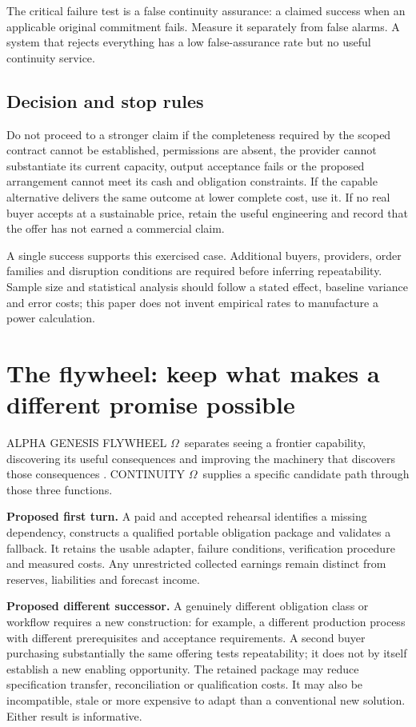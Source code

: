 \documentclass[11pt,a4paper]{article}
\newcommand{\om}{CONTINUITY $\Omega$}
\newcommand{\genesis}{ALPHA GENESIS FLYWHEEL $\Omega$}
\newcommand{\chapterpage}{\clearpage}
\begin{document}
The critical failure test is a false continuity assurance: a claimed success when an applicable original commitment fails. Measure it separately from false alarms. A system that rejects everything has a low false-assurance rate but no useful continuity service.

\subsection{Decision and stop rules}
Do not proceed to a stronger claim if the completeness required by the scoped contract cannot be established, permissions are absent, the provider cannot substantiate its current capacity, output acceptance fails or the proposed arrangement cannot meet its cash and obligation constraints. If the capable alternative delivers the same outcome at lower complete cost, use it. If no real buyer accepts at a sustainable price, retain the useful engineering and record that the offer has not earned a commercial claim.

A single success supports this exercised case. Additional buyers, providers, order families and disruption conditions are required before inferring repeatability. Sample size and statistical analysis should follow a stated effect, baseline variance and error costs; this paper does not invent empirical rates to manufacture a power calculation.

\chapterpage
\section{The flywheel: keep what makes a different promise possible}\label{sec:flywheel}
\genesis\ separates seeing a frontier capability, discovering its useful consequences and improving the machinery that discovers those consequences \cite{boucherGenesis}. \om\ supplies a specific candidate path through those three functions.

\textbf{Proposed first turn.} A paid and accepted rehearsal identifies a missing dependency, constructs a qualified portable obligation package and validates a fallback. It retains the usable adapter, failure conditions, verification procedure and measured costs. Any unrestricted collected earnings remain distinct from reserves, liabilities and forecast income.

\textbf{Proposed different successor.} A genuinely different obligation class or workflow requires a new construction: for example, a different production process with different prerequisites and acceptance requirements. A second buyer purchasing substantially the same offering tests repeatability; it does not by itself establish a new enabling opportunity. The retained package may reduce specification transfer, reconciliation or qualification costs. It may also be incompatible, stale or more expensive to adapt than a conventional new solution. Either result is informative.
\end{document}
